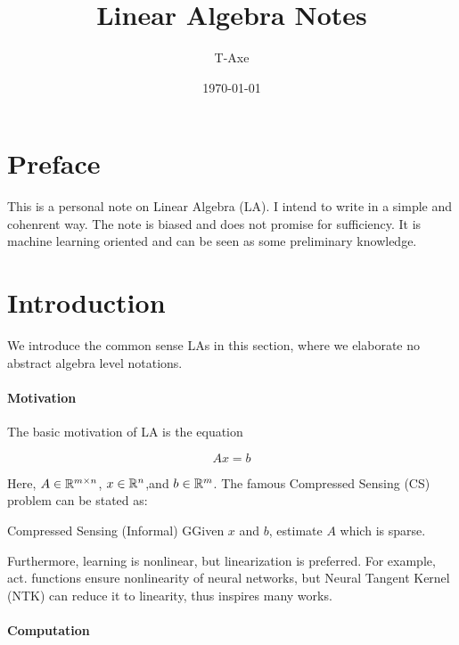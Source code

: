 \documentclass[a4,10pt]{ctexart}
\begin{document}
\title{Linear Algebra Notes}
\author{T-Axe}
\date{\today}
\maketitle
\tableofcontents
\newpage
{}
\newpage


\section{Preface}

This is a personal note on Linear Algebra (LA). I intend to write in a simple and cohenrent way. The note is biased and does not promise for sufficiency. It is machine learning oriented and can be seen as some preliminary knowledge.



\section{Introduction}

We introduce the common sense LAs in this section, where we elaborate no abstract algebra level notations.

\paragraph{Motivation}

The basic motivation of LA is the equation

\begin{equation}
    Ax = b
\end{equation}

Here, $A \in \mathbb{R}^{m \times n}$, $x \in \mathbb{R}^n$,and $b \in \mathbb{R}^m$. The famous Compressed Sensing (CS) problem can be stated as:


\begin{qn}{Compressed Sensing (Informal)}
  GGiven $x$ and $b$, estimate $A$ which is sparse.
\end{qn}

Furthermore, learning is nonlinear, but linearization is preferred. For example, act. functions ensure nonlinearity of neural networks, but Neural Tangent Kernel (NTK) can reduce it to linearity, thus inspires many works.    
   
 
\paragraph{Computation}
\end{document}

